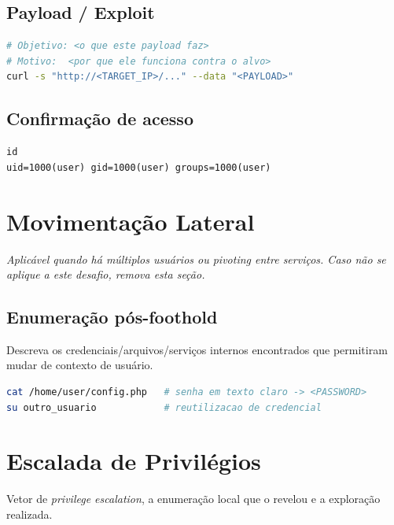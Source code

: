 \documentclass[12pt,a4paper]{article}
\begin{document}
\subsection{Payload / Exploit}
\begin{lstlisting}[language=bash,caption={Payload utilizado para explorar a falha (comentado).}]
# Objetivo: <o que este payload faz>
# Motivo:  <por que ele funciona contra o alvo>
curl -s "http://<TARGET_IP>/..." --data "<PAYLOAD>"
\end{lstlisting}

\subsection{Confirmação de acesso}
\begin{lstlisting}[style=output,caption={Output que confirma a execução de comandos / shell obtido.}]
id
uid=1000(user) gid=1000(user) groups=1000(user)
\end{lstlisting}

\section{Movimentação Lateral}
\textit{Aplicável quando há múltiplos usuários ou \emph{pivoting} entre
serviços. Caso não se aplique a este desafio, remova esta seção.}

\subsection{Enumeração pós-foothold}
Descreva os credenciais/arquivos/serviços internos encontrados que permitiram
mudar de contexto de usuário.

\begin{lstlisting}[language=bash,caption={Coleta de credenciais reutilizáveis.}]
cat /home/user/config.php   # senha em texto claro -> <PASSWORD>
su outro_usuario            # reutilizacao de credencial
\end{lstlisting}

\section{Escalada de Privilégios}
Vetor de \emph{privilege escalation}, a enumeração local que o revelou e a
exploração realizada.
\end{document}
